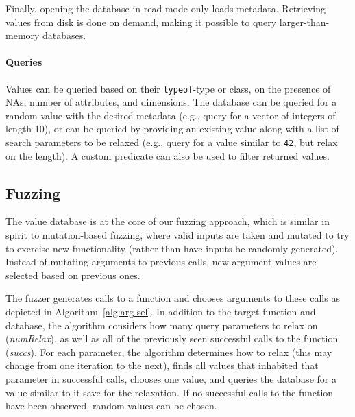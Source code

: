\documentclass[sigplan,nonacm,anonymous,review]{acmart}
\begin{document}
Finally, opening the database in {read mode} only loads metadata.
Retrieving values from disk is done on demand, making it possible to
query larger-than-memory databases.

\paragraph{Queries}

Values can be queried based on their {\tt typeof}-type or class, on
the presence of NAs, number of attributes, and dimensions.  The database
can be queried for a random value with the desired metadata (e.g., query for a
vector of integers of length 10), or can be queried by providing an
existing value along with a list of search parameters to be relaxed
(e.g., query for a value similar to {\tt 42}, but relax
on the length).  A custom predicate can also be used to filter
returned values.

\subsection{Fuzzing}

The value database is at the core of our fuzzing approach, which is
similar in spirit to mutation-based fuzzing, where valid inputs are taken 
and mutated to try to exercise new functionality (rather than have inputs 
be randomly generated). Instead of mutating arguments to previous calls, 
new argument values are selected based on previous ones.

The fuzzer generates calls to a function and chooses arguments to these
calls as depicted in Algorithm~\ref{alg:arg-sel}.  In addition to the
target function and database, the algorithm considers how many query
parameters to relax on (\emph{numRelax}), as well as all of the
previously seen successful calls to the function (\emph{succs}).
For each parameter, the algorithm determines how to relax (this may
change from one iteration to the next), finds all values that
inhabited that parameter in successful calls, chooses one value, and
queries the database for a value similar to it save for the
relaxation.  If no successful calls to the function have been
observed, random values can be chosen.
\end{document}
